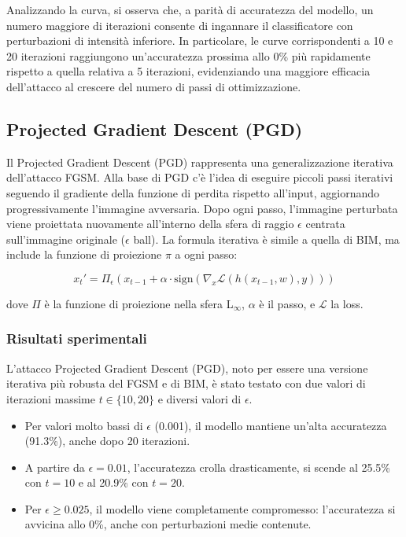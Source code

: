                 \noindent Analizzando la curva, si osserva che, a parità di accuratezza del modello, un numero maggiore di iterazioni consente di ingannare il classificatore con perturbazioni di intensità inferiore. In particolare, le curve corrispondenti a 10 e 20 iterazioni raggiungono un’accuratezza prossima allo 0\% più rapidamente rispetto a quella relativa a 5 iterazioni, evidenziando una maggiore efficacia dell’attacco al crescere del numero di passi di ottimizzazione.

        \subsection{Projected Gradient Descent (PGD)}
            Il Projected Gradient Descent (PGD) rappresenta una generalizzazione iterativa dell’attacco FGSM. Alla base di PGD c’è l’idea di eseguire piccoli passi iterativi seguendo il gradiente della funzione di perdita rispetto all'input, aggiornando progressivamente l'immagine avversaria. Dopo ogni passo, l’immagine perturbata viene proiettata nuovamente all’interno della sfera di raggio $\epsilon$ centrata sull’immagine originale ($\epsilon$ ball).
            La formula iterativa è simile a quella di BIM, ma include la funzione di proiezione $\pi$ a ogni passo:
            
            \[
            x_t' = \Pi_\epsilon \left( x_{t-1} + \alpha \cdot \text{sign} \left( \nabla_x \mathcal{L}(h(x_{t-1}, w), y) \right) \right)
            \]
            
            \noindent dove $\Pi$ è la funzione di proiezione nella sfera L$_\infty$, $\alpha$ è il passo, e $\mathcal{L}$ la loss.

            \subsubsection*{Risultati sperimentali}
                \noindent L'attacco Projected Gradient Descent (PGD), noto per essere una versione iterativa più robusta del FGSM e di BIM, è stato testato con due valori di iterazioni massime $t \in \{10, 20\}$ e diversi valori di $\epsilon$.
                
                \begin{itemize}
                    \item Per valori molto bassi di $\epsilon$ (0.001), il modello mantiene un’alta accuratezza (91.3\%), anche dopo 20 iterazioni.
                    \item A partire da $\epsilon = 0.01$, l’accuratezza crolla drasticamente, si scende al 25.5\% con $t=10$ e al 20.9\% con $t=20$.
                    \item Per $\epsilon \geq 0.025$, il modello viene completamente compromesso: l’accuratezza si avvicina allo 0\%, anche con perturbazioni medie contenute.
                \end{itemize}
                
